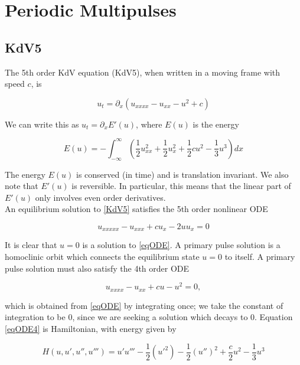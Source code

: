 \documentclass[12pt]{article}
\begin{document}
\section{Periodic Multipulses}

\subsection{KdV5}

The 5th order KdV equation (KdV5), when written in a moving frame with speed $c$, is

\begin{equation}\label{KdV5}
u_t = \partial_x(u_{xxxx} - u_{xx} - u^2 + c)
\end{equation}

We can write this as $u_t = \partial_x E'(u)$, where $E(u)$ is the energy

\begin{equation}\label{energy}
E(u) = -\int_{-\infty}^{\infty} \left( \frac{1}{2}u_{xx}^2 + \frac{1}{2}u_x^2 + \frac{1}{2}cu^2 - \frac{1}{3}u^3 \right) dx
\end{equation}

The energy $E(u)$ is conserved (in time) and is translation invariant. We also note that $E'(u)$ is reversible. In particular, this means that the linear part of $E'(u)$ only involves even order derivatives.\\

An equilibrium solution to \eqref{KdV5} satisfies the 5th order nonlinear ODE

\begin{equation}\label{eqODE}
u_{xxxxx} - u_{xxx} + c u_x - 2 u u_x = 0
\end{equation}

It is clear that $u = 0$ is a solution to \eqref{eqODE}. A primary pulse solution is a homoclinic orbit which connects the equilibrium state $u = 0$ to itself. A primary pulse solution must also satisfy the 4th order ODE

\begin{equation}\label{eqODE4}
u_{xxxx} - u_{xx} + c u - u^2 = 0,
\end{equation}

which is obtained from \eqref{eqODE} by integrating once; we take the constant of integration to be 0, since we are seeking a solution which decays to 0. Equation \eqref{eqODE4} is Hamiltonian, with energy given by

\begin{equation}\label{Hamiltonian}
H(u, u', u'', u''') = u'u''' - \frac{1}{2}(u'^2) - \frac{1}{2}(u'')^2 + \frac{c}{2}u^2 - \frac{1}{3}u^3 
\end{equation}
\end{document}
